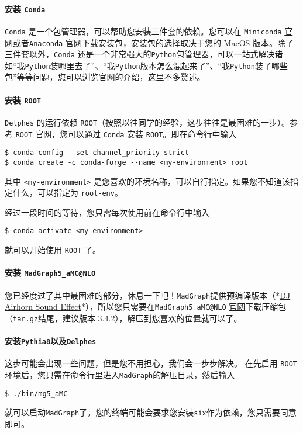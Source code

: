 \documentclass[a4paper]{ctexart}
\begin{document}
\paragraph{安装 \texttt{Conda}} \texttt{Conda} 是一个包管理器，可以帮助您安装三件套的依赖。您可以在 \texttt{Miniconda} \href{https://docs.conda.io/en/latest/miniconda.html}{官网}或者\texttt{Anaconda} \href{https://www.anaconda.com/download/}{官网}下载安装包，安装包的选择取决于您的 MacOS 版本。除了三件套以外，\texttt{Conda} 还是一个非常强大的\texttt{Python}包管理器，可以一站式解决诸如``我\texttt{Python}装哪里去了''、``我\texttt{Python}版本怎么混起来了''、``我\texttt{Python}装了哪些包''等等问题，您可以浏览官网的介绍，这里不多赘述。

\paragraph{安装 \texttt{ROOT}} \texttt{Delphes} 的运行依赖 \texttt{ROOT}（按照以往同学的经验，这步往往是最困难的一步）。参考 \texttt{ROOT} \href{https://root.cern/install/}{官网}，您可以通过 \texttt{Conda} 安装 \texttt{ROOT}。即在命令行中输入
\begin{verbatim}
$ conda config --set channel_priority strict
$ conda create -c conda-forge --name <my-environment> root
\end{verbatim}
其中 \texttt{<my-environment>} 是您喜欢的环境名称，可以自行指定。如果您不知道该指定什么，可以指定为 \texttt{root-env}。

经过一段时间的等待，您只需每次使用前在命令行中输入
\begin{verbatim}
$ conda activate <my-environment>
\end{verbatim}
就可以开始使用 \texttt{ROOT} 了。

\paragraph{安装 \texttt{MadGraph5\_aMC@NLO}} 您已经度过了其中最困难的部分，休息一下吧！\texttt{MadGraph}提供预编译版本（*\href{https://www.youtube.com/watch?v=OFr74zI1LBM}{DJ Airhorn Sound Effect}*），所以您只需要在\texttt{MadGraph5\_aMC@NLO} \href{https://launchpad.net/mg5amcnlo}{官网}下载压缩包（\texttt{tar.gz}结尾，建议版本 3.4.2），解压到您喜欢的位置就可以了。

\paragraph{安装\texttt{Pythia8}以及\texttt{Delphes}} 这步可能会出现一些问题，但是您不用担心，我们会一步步解决。
在先启用 \texttt{ROOT}环境后，您只需在命令行里进入\texttt{MadGraph}的解压目录，然后输入
\begin{verbatim}
$ ./bin/mg5_aMC
\end{verbatim}
就可以启动\texttt{MadGraph}了。您的终端可能会要求您安装\texttt{six}作为依赖，您只需要同意即可。
\end{document}
